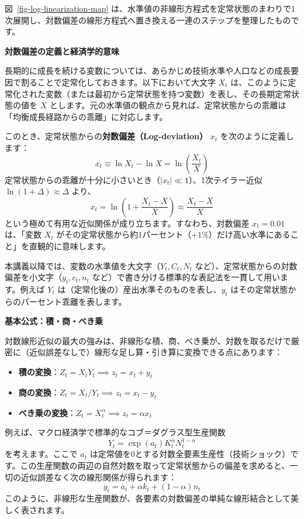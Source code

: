 \documentclass[
  japanese,
  lualatex,
  ja=standard,
  12pt,
  a4paper]{ltjsarticle}
\providecommand{\tightlist}{%
  \setlength{\itemsep}{0pt}\setlength{\parskip}{0pt}}
\begin{document}
図~\ref{fig-log-linearization-map}
は、水準値の非線形方程式を定常状態のまわりで1次展開し、対数偏差の線形方程式へ置き換える一連のステップを整理したものです。


\textbf{対数偏差の定義と経済学的意味}

長期的に成長を続ける変数については、あらかじめ技術水準や人口などの成長要因で割ることで定常化しておきます。以下において大文字
\(X_t\)
は、このように定常化された変数（または最初から定常状態を持つ変数）を表し、その長期定常状態の値を
\(X\)
とします。元の水準値の観点から見れば、定常状態からの乖離は「均衡成長経路からの乖離」に対応します。

このとき、定常状態からの\textbf{対数偏差（Log-deviation）} \(x_t\)
を次のように定義します： \[
x_t
\equiv
\ln X_t-\ln X
=
\ln\left(\frac{X_t}{X}\right)
\]
定常状態からの乖離が十分に小さいとき（\(|x_t|\ll 1\)）、1次テイラー近似
\(\ln(1+\Delta) \approx \Delta\) より、 \[
x_t
=
\ln\left(1+\frac{X_t-X}{X}\right)
\approx
\frac{X_t-X}{X}
\] という極めて有用な近似関係が成り立ちます。すなわち、対数偏差
\(x_t=0.01\) は、「変数 \(X_t\)
がその定常状態から約1パーセント（\(+1\%\)）だけ高い水準にあること」を直観的に意味します。

本講義以降では、変数の水準値を大文字（\(Y_t, C_t, N_t\)
など）、定常状態からの対数偏差を小文字（\(y_t, c_t, n_t\)
など）で書き分ける標準的な表記法を一貫して用います。例えば \(Y_t\)
は（定常化後の）産出水準そのものを表し、\(y_t\)
はその定常状態からのパーセント乖離を表します。

\textbf{基本公式：積・商・べき乗}

対数線形近似の最大の強みは、非線形な積、商、べき乗が、対数を取るだけで厳密に（近似誤差なしで）線形な足し算・引き算に変換できる点にあります：

\begin{itemize}
\tightlist
\item
  \textbf{積の変換}：\(Z_t=X_tY_t \implies z_t=x_t+y_t\)
\item
  \textbf{商の変換}：\(Z_t=X_t/Y_t \implies z_t=x_t-y_t\)
\item
  \textbf{べき乗の変換}：\(Z_t=X_t^\alpha \implies z_t=\alpha x_t\)
\end{itemize}

例えば、マクロ経済学で標準的なコブ＝ダグラス型生産関数 \[
Y_t=\exp(a_t)K_t^\alpha N_t^{1-\alpha}
\] を考えます。ここで \(a_t\)
は定常値を0とする対数全要素生産性（技術ショック）です。この生産関数の両辺の自然対数を取って定常状態からの偏差を求めると、一切の近似誤差なく次の線形関係が得られます：
\[
y_t=a_t+\alpha k_t+(1-\alpha)n_t
\]
このように、非線形な生産関数が、各要素の対数偏差の単純な線形結合として美しく表されます。
\end{document}

